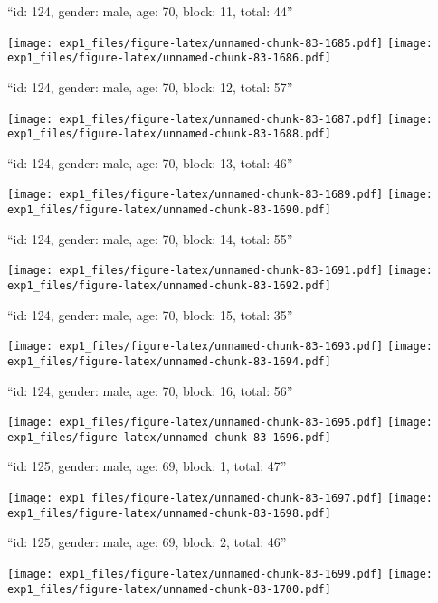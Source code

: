 \documentclass[11pt,,]{article}
\begin{document}
\newpage
[1] 

``id: 124, gender: male, age: 70, block: 11, total: 44''

\texttt{[image: exp1\_files/figure-latex/unnamed-chunk-83-1685.pdf]}
\texttt{[image: exp1\_files/figure-latex/unnamed-chunk-83-1686.pdf]}

\newpage
[1] 

``id: 124, gender: male, age: 70, block: 12, total: 57''

\texttt{[image: exp1\_files/figure-latex/unnamed-chunk-83-1687.pdf]}
\texttt{[image: exp1\_files/figure-latex/unnamed-chunk-83-1688.pdf]}

\newpage
[1] 

``id: 124, gender: male, age: 70, block: 13, total: 46''

\texttt{[image: exp1\_files/figure-latex/unnamed-chunk-83-1689.pdf]}
\texttt{[image: exp1\_files/figure-latex/unnamed-chunk-83-1690.pdf]}

\newpage
[1] 

``id: 124, gender: male, age: 70, block: 14, total: 55''

\texttt{[image: exp1\_files/figure-latex/unnamed-chunk-83-1691.pdf]}
\texttt{[image: exp1\_files/figure-latex/unnamed-chunk-83-1692.pdf]}

\newpage
[1] 

``id: 124, gender: male, age: 70, block: 15, total: 35''

\texttt{[image: exp1\_files/figure-latex/unnamed-chunk-83-1693.pdf]}
\texttt{[image: exp1\_files/figure-latex/unnamed-chunk-83-1694.pdf]}

\newpage
[1] 

``id: 124, gender: male, age: 70, block: 16, total: 56''

\texttt{[image: exp1\_files/figure-latex/unnamed-chunk-83-1695.pdf]}
\texttt{[image: exp1\_files/figure-latex/unnamed-chunk-83-1696.pdf]}

\newpage
[1] 

``id: 125, gender: male, age: 69, block: 1, total: 47''

\texttt{[image: exp1\_files/figure-latex/unnamed-chunk-83-1697.pdf]}
\texttt{[image: exp1\_files/figure-latex/unnamed-chunk-83-1698.pdf]}

\newpage
[1] 

``id: 125, gender: male, age: 69, block: 2, total: 46''

\texttt{[image: exp1\_files/figure-latex/unnamed-chunk-83-1699.pdf]}
\texttt{[image: exp1\_files/figure-latex/unnamed-chunk-83-1700.pdf]}
\end{document}
